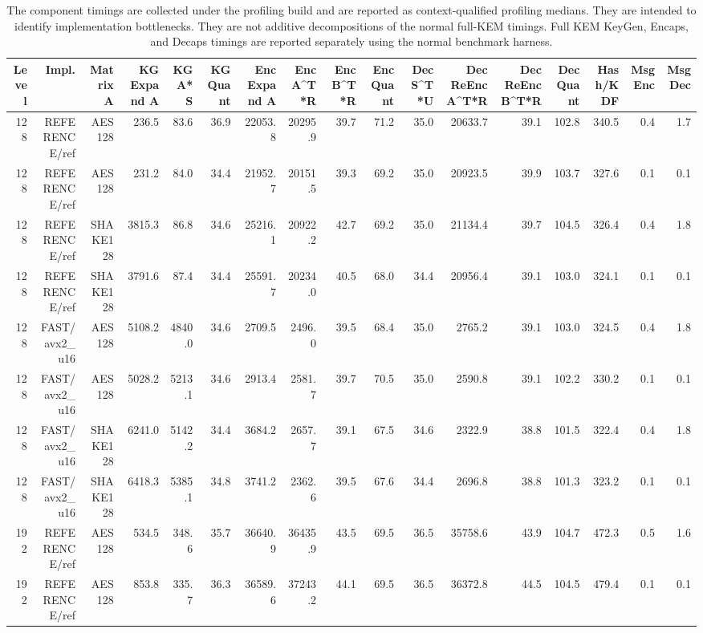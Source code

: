 \begin{table}[t]
\centering
\caption{The component timings are collected under the profiling build and are reported as context-qualified profiling medians. They are intended to identify implementation bottlenecks. They are not additive decompositions of the normal full-KEM timings. Full KEM KeyGen, Encaps, and Decaps timings are reported separately using the normal benchmark harness.}
\begin{tabular}{rrrrrrrrrrrrrrrrr}
\toprule
Level & Impl. & Matrix A & KG Expand A & KG A*S & KG Quant & Enc Expand A & Enc A^T*R & Enc B^T*R & Enc Quant & Dec S^T*U & Dec ReEnc A^T*R & Dec ReEnc B^T*R & Dec Quant & Hash/KDF & Msg Enc & Msg Dec \\
\midrule
128 & REFERENCE/ref & AES128 & 236.5 & 83.6 & 36.9 & 22053.8 & 20295.9 & 39.7 & 71.2 & 35.0 & 20633.7 & 39.1 & 102.8 & 340.5 & 0.4 & 1.7 \\
128 & REFERENCE/ref & AES128 & 231.2 & 84.0 & 34.4 & 21952.7 & 20151.5 & 39.3 & 69.2 & 35.0 & 20923.5 & 39.9 & 103.7 & 327.6 & 0.1 & 0.1 \\
128 & REFERENCE/ref & SHAKE128 & 3815.3 & 86.8 & 34.6 & 25216.1 & 20922.2 & 42.7 & 69.2 & 35.0 & 21134.4 & 39.7 & 104.5 & 326.4 & 0.4 & 1.8 \\
128 & REFERENCE/ref & SHAKE128 & 3791.6 & 87.4 & 34.4 & 25591.7 & 20234.0 & 40.5 & 68.0 & 34.4 & 20956.4 & 39.1 & 103.0 & 324.1 & 0.1 & 0.1 \\
128 & FAST/avx2_u16 & AES128 & 5108.2 & 4840.0 & 34.6 & 2709.5 & 2496.0 & 39.5 & 68.4 & 35.0 & 2765.2 & 39.1 & 103.0 & 324.5 & 0.4 & 1.8 \\
128 & FAST/avx2_u16 & AES128 & 5028.2 & 5213.1 & 34.6 & 2913.4 & 2581.7 & 39.7 & 70.5 & 35.0 & 2590.8 & 39.1 & 102.2 & 330.2 & 0.1 & 0.1 \\
128 & FAST/avx2_u16 & SHAKE128 & 6241.0 & 5142.2 & 34.4 & 3684.2 & 2657.7 & 39.1 & 67.5 & 34.6 & 2322.9 & 38.8 & 101.5 & 322.4 & 0.4 & 1.8 \\
128 & FAST/avx2_u16 & SHAKE128 & 6418.3 & 5385.1 & 34.8 & 3741.2 & 2362.6 & 39.5 & 67.6 & 34.4 & 2696.8 & 38.8 & 101.3 & 323.2 & 0.1 & 0.1 \\
192 & REFERENCE/ref & AES128 & 534.5 & 348.6 & 35.7 & 36640.9 & 36435.9 & 43.5 & 69.5 & 36.5 & 35758.6 & 43.9 & 104.7 & 472.3 & 0.5 & 1.6 \\
192 & REFERENCE/ref & AES128 & 853.8 & 335.7 & 36.3 & 36589.6 & 37243.2 & 44.1 & 69.5 & 36.5 & 36372.8 & 44.5 & 104.5 & 479.4 & 0.1 & 0.1 \\

\end{tabular}
\end{table}
